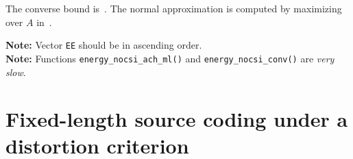 \documentclass[a4paper,11p]{memoir}
\begin{document}
	The converse bound is~\cite[Theorem 6]{YDP15}. The normal approximation is computed by maximizing over $A$
	in~\cite[(64)]{YDP15}.

\medskip
\noindent\textbf{Note:} Vector \verb|EE| should be in ascending order.\\
\textbf{Note:} Functions \verb|energy_nocsi_ach_ml()| and \verb|energy_nocsi_conv()| are \textit{very slow}. 











\chapter{Fixed-length source coding under a distortion criterion}
\end{document}
